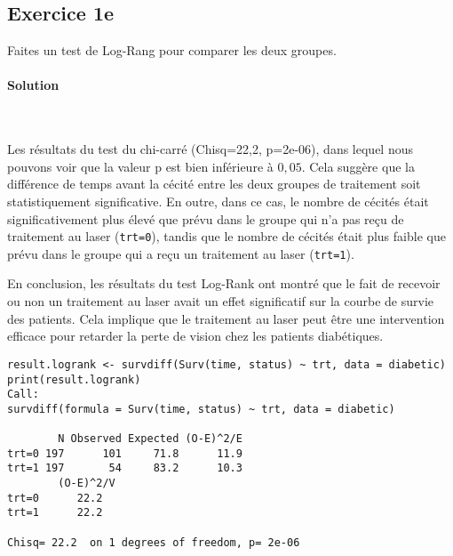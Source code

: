 \documentclass[../main.tex]{subfiles}
\begin{document}
\begin{CJK*}{UTF8}{gbsn}

\section*{Exercice 1e}
Faites un test de Log-Rang pour comparer les deux groupes.
    
\paragraph{Solution}\
    
Les résultats du test du chi-carré (Chisq=22,2, p=2e-06), 
dans lequel nous pouvons voir que la valeur p est bien inférieure à $0,05$. 
Cela suggère que la différence de temps avant la cécité entre les deux 
groupes de traitement soit statistiquement significative. 
En outre, dans ce cas, le nombre de cécités était significativement 
plus élevé que prévu dans le groupe qui n'a pas reçu de traitement au laser 
(\texttt{trt=0}), tandis que le nombre de cécités était plus faible que prévu 
dans le groupe qui a reçu un traitement au laser (\texttt{trt=1}).
    
En conclusion, les résultats du test Log-Rank ont 
montré que le fait de recevoir ou non un traitement 
au laser avait un effet significatif sur la courbe 
de survie des patients. Cela implique que le 
traitement au laser peut être une intervention efficace pour retarder la perte de vision chez les patients diabétiques.
    
\begin{lstlisting}
result.logrank <- survdiff(Surv(time, status) ~ trt, data = diabetic)
print(result.logrank)
Call:
survdiff(formula = Surv(time, status) ~ trt, data = diabetic)
    
        N Observed Expected (O-E)^2/E
trt=0 197      101     71.8      11.9
trt=1 197       54     83.2      10.3
        (O-E)^2/V
trt=0      22.2
trt=1      22.2
    
Chisq= 22.2  on 1 degrees of freedom, p= 2e-06 
\end{lstlisting}

\end{CJK*}
\end{document}
